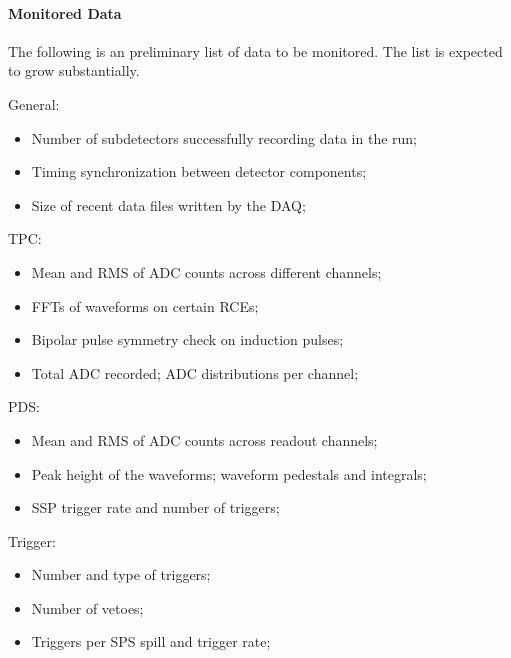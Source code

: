 \paragraph{Monitored Data}

The following is an preliminary list of data to be 
monitored.  The list is expected to grow substantially.

General:
\begin{itemize}
\item{Number of subdetectors successfully recording data in the run;}
\item{Timing synchronization between detector components;}
\item{Size of recent data files written by the DAQ;}
\end{itemize}
  TPC:
\begin{itemize}
\item{Mean and RMS of ADC counts across different channels;}
\item{FFTs of waveforms on certain RCEs;}
\item{Bipolar pulse symmetry check on induction pulses;}
\item{Total ADC recorded; ADC distributions per channel;}
\end{itemize}
  PDS:
\begin{itemize}
\item{Mean and RMS of ADC counts across readout channels;}
\item{Peak height of the waveforms; waveform pedestals and integrals;}
\item{SSP trigger rate and number of triggers;}
\end{itemize}
  Trigger:
\begin{itemize}
\item{Number and type of triggers;}
\item{Number of vetoes;}
\item{Triggers per SPS spill and trigger rate;}
\end{itemize}



